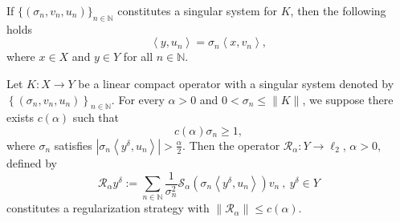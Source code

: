 \documentclass[10pt,a4paper]{amsart}
\begin{document}
\begin{lemma}\label{lem2.6}
     If $\{(\sigma_{n},v_{n},u_{n})\}_{n\in\mathbb{N}}$ constitutes a singular system for $K$, then the following holds
    \begin{equation*}
        \left<y,u_{n}\right>=\sigma_{n}\left<x,v_{n}\right>,
    \end{equation*}
    where $x\in X$ and $y\in Y$ for all $n\in\mathbb{N}$.
\end{lemma}

\begin{theorem}\label{the3.6}
    Let $K: X\rightarrow Y$ be a linear compact operator with a singular system denoted by $\left\{\left(\sigma_{n},v_{n},u_{n}\right)\right\}_{n\in\mathbb{N}}$. For every $\alpha>0$ and $0<\sigma_{n}\leq\|K\|$, we suppose there exists $c(\alpha)$ such that
    \begin{equation*}
        c(\alpha)\sigma_{n}\geq 1,
    \end{equation*}
    where $\sigma_{n}$ satisfies $\left|\sigma_{n}\left<y^{\delta}, u_{n}\right>\right|>\frac{\alpha}{2}$. Then the operator $\mathcal{R}_{\alpha}:Y\rightarrow \ell_{2}$, $\alpha>0$, defined by
    \begin{equation*}
        \mathcal{R}_{\alpha}y^{\delta}:=\sum_{n\in\mathbb{N}}\frac{1}{\sigma_{n}^2}\mathcal{S}_{\alpha}(\sigma_{n}\left<y^{\delta},u_{n}\right>)v_{n}\ ,\ y^{\delta}\in Y
    \end{equation*}
    constitutes a regularization strategy with $\|\mathcal{R}_{\alpha}\|\leq c(\alpha)$.
\end{theorem}
\end{document}
